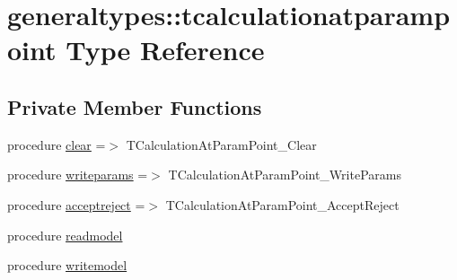 \hypertarget{structgeneraltypes_1_1tcalculationatparampoint}{}\section{generaltypes\+:\+:tcalculationatparampoint Type Reference}
\label{structgeneraltypes_1_1tcalculationatparampoint}
\subsection*{Private Member Functions}
\begin{DoxyCompactItemize}
\item 
procedure \mbox{\hyperlink{structgeneraltypes_1_1tcalculationatparampoint_a27652030ade7edd12e0ac7dcb986dd32}{clear}} =$>$ T\+Calculation\+At\+Param\+Point\+\_\+\+Clear
\item 
procedure \mbox{\hyperlink{structgeneraltypes_1_1tcalculationatparampoint_a3664d3aa6c085021bde806caae56ab5d}{writeparams}} =$>$ T\+Calculation\+At\+Param\+Point\+\_\+\+Write\+Params
\item 
procedure \mbox{\hyperlink{structgeneraltypes_1_1tcalculationatparampoint_a4b46b0e6d794fc4c30a127d715abce03}{acceptreject}} =$>$ T\+Calculation\+At\+Param\+Point\+\_\+\+Accept\+Reject
\item 
procedure \mbox{\hyperlink{structgeneraltypes_1_1tcalculationatparampoint_a9d4038931f7b01b82009db1d53d671f2}{readmodel}}
\item 
procedure \mbox{\hyperlink{structgeneraltypes_1_1tcalculationatparampoint_a17222b3e549f939333fc9923c0e681ee}{writemodel}}
\end{DoxyCompactItemize}
